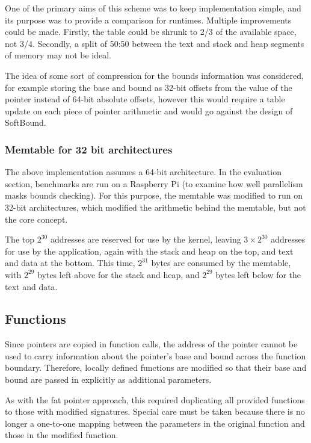 One of the primary aims of this scheme was to keep implementation simple, and its purpose was to provide a comparison for runtimes.
Multiple improvements could be made.
Firstly, the table could be shrunk to 2/3 of the available space, not 3/4.
Secondly, a split of 50:50 between the text and stack and heap segments of memory may not be ideal.

The idea of some sort of compression for the bounds information was considered, for example storing the base and bound as 32-bit offsets from the value of the pointer instead of 64-bit absolute offsets, however this would require a table update on each piece of pointer arithmetic and would go against the design of SoftBound.

\subsubsection{Memtable for 32 bit architectures}

The above implementation assumes a 64-bit architecture.
In the evaluation section, benchmarks are run on a Raspberry Pi (to examine how well parallelism masks bounds checking).
For this purpose, the memtable was modified to run on 32-bit architectures, which modified the arithmetic behind the memtable, but not the core concept.

The top $2^{30}$ addresses are reserved for use by the kernel, leaving $3 \times 2^{30}$ addresses for use by the application, again with the stack and heap on the top, and text and data at the bottom.
This time, $2^{31}$ bytes are consumed by the memtable, with $2^{29}$ bytes left above for the stack and heap, and $2^{29}$ bytes left below for the text and data.
\subsection{Functions}

Since pointers are copied in function calls, the address of the pointer cannot be used to carry information about the pointer's base and bound across the function boundary.
Therefore, locally defined functions are modified so that their base and bound are passed in explicitly as additional parameters.

As with the fat pointer approach, this required duplicating all provided functions to those with modified signatures.
Special care must be taken because there is no longer a one-to-one mapping between the parameters in the original function and those in the modified function.

